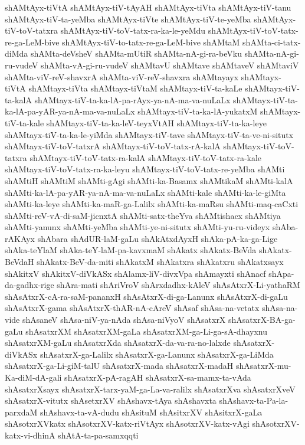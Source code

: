 {shAMtAyx-tiVtA
shAMtAyx-tiV-tAyAH
shAMtAyx-tiVta
shAMtAyx-tiV-tanu
shAMtAyx-tiV-ta-yeMba
shAMtAyx-tiVte
shAMtAyx-tiV-te-yeMba
shAMtAyx-tiV-toV-tatxra
shAMtAyx-tiV-toV-tatx-ra-ka-le-yeMdu
shAMtAyx-tiV-toV-tatx-re-ga-LeM-bive
shAMtAyx-tiV-to-tatx-re-ga-LeM-bive
shAMtaM
shAMta-ci-tatx-diMda
shAMta-deVsheV
shAMta-mUtiR
shAMta-nA-gi-ra-beVku
shAMta-nA-gi-ru-vudeV
shAMta-vA-gi-ru-vudeV
shAMtavU
shAMtave
shAMtaveV
shAMtaviV
shAMta-viV-reV-shavxrA
shAMta-viV-reV-shavxra
shAMtayayx
shAMtayx-tiVtA
shAMtayx-tiVta
shAMtayx-tiVtaM
shAMtayx-tiV-ta-kaLe
shAMtayx-tiV-ta-kalA
shAMtayx-tiV-ta-ka-lA-pa-rAyx-ya-nA-ma-va-nuLaLx
shAMtayx-tiV-ta-ka-lA-pa-yAR-ya-nA-ma-va-nuLaLx
shAMtayx-tiV-ta-ka-lA-yukatxM
shAMtayx-tiV-ta-kale
shAMtayx-tiV-ta-ka-leV-teyxVtAH
shAMtayx-tiV-ta-ka-leye
shAMtayx-tiV-ta-ka-le-yiMda
shAMtayx-tiV-tave
shAMtayx-tiV-ta-ve-ni-situtx
shAMtayx-tiV-toV-tatxrA
shAMtayx-tiV-toV-tatx-rA-kalA
shAMtayx-tiV-toV-tatxra
shAMtayx-tiV-toV-tatx-ra-kalA
shAMtayx-tiV-toV-tatx-ra-kale
shAMtayx-tiV-toV-tatx-ra-ka-leyu
shAMtayx-tiV-toV-tatx-re-yeMba
shAMti
shAMtiH
shAMtiM
shAMti-gAgi
shAMti-ka-Basamx
shAMtikaM
shAMti-kalA
shAMti-ka-lA-pa-yAR-ya-nA-ma-va-nuLaLx
shAMti-kale
shAMti-ka-le-giMta
shAMti-ka-leye
shAMti-ka-maR-ga-Lalilx
shAMti-ka-maRsu
shAMti-maq-caCxti
shAMti-reV-vA-di-saM-jicnxtA
shAMti-satx-theYva
shAMtishacx
shAMtiya
shAMti-yanunx
shAMti-yeMba
shAMti-ye-ni-situtx
shAMti-yu-ru-videyx
shAba-rAKAyx
shAbara
shAdUR-laM-gaLu
shAkAtxdAyxH
shAka-pA-ka-ga-Lige
shAka-teYlaM
shAka-teY-laM-pa-kavxmaM
shAkatx
shAkatx-BeVda
shAkatx-BeVdaH
shAkatx-BeV-da-miti
shAkatxM
shAkatxra
shAkatxru
shAkatxsayx
shAkitxV
shAkitxV-diVkASx
shAlamx-liV-divxVpa
shAmayxti
shAnacf
shApa-da-gadhx-rige
shAra-mati
shAriVroV
shArxdadhx-kAleV
shAsAtxrX-Li-yathaRM
shAsAtxrX-cA-ra-saM-pananxH
shAsAtxrX-di-ga-Lanunx
shAsAtxrX-di-gaLu
shAsAtxrX-gama
shAsAtxrX-thAR-nA-cAreV
shAsaf
shAsa-na-vetatx
shAsa-na-vide
shAsaneV
shAsa-niV-ya-nAda
shAsa-niVyoV
shAsatxrX
shAsatxrX-BA-ga-gaLu
shAsatxrXM
shAsatxrXM-gaLa
shAsatxrXM-ga-Li-ga-sA-dhayxnu
shAsatxrXM-gaLu
shAsatxrXda
shAsatxrX-da-va-ra-no-lalxde
shAsatxrX-diVkASx
shAsatxrX-ga-Lalilx
shAsatxrX-ga-Lanunx
shAsatxrX-ga-LiMda
shAsatxrX-ga-Li-giM-talU
shAsatxrX-mada
shAsatxrX-madaH
shAsatxrX-mu-Ka-diM-dA-gali
shAsatxrX-pA-ragAH
shAsatxrX-sa-mamx-ta-vAda
shAsatxrXsayx
shAsatxrX-tarx-yaM-ga-La-va-ralilx
shAsatxrXva
shAsatxrXveV
shAsatxrX-vitutx
shAsetxrXV
shAshavx-tAya
shAshavxta
shAshavx-ta-Pa-la-parxdaM
shAshavx-ta-vA-dudu
shAsituM
shAsitxrXV
shAsitxrX-gaLa
shAsotxrXVkatx
shAsotxrXV-katx-riVtAyx
shAsotxrXV-katx-vAgi
shAsotxrXV-katx-vi-dhinA
shAtA-ta-pa-samxqqti
}
